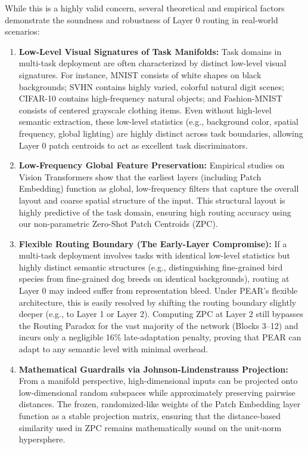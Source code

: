 \documentclass{article}
\theoremstyle{plain}
\theoremstyle{definition}
\theoremstyle{remark}
\begin{document}
While this is a highly valid concern, several theoretical and empirical factors demonstrate the soundness and robustness of Layer 0 routing in real-world scenarios:
\begin{enumerate}
    \item \textbf{Low-Level Visual Signatures of Task Manifolds:} Task domains in multi-task deployment are often characterized by distinct low-level visual signatures. For instance, MNIST consists of white shapes on black backgrounds; SVHN contains highly varied, colorful natural digit scenes; CIFAR-10 contains high-frequency natural objects; and Fashion-MNIST consists of centered grayscale clothing items. Even without high-level semantic extraction, these low-level statistics (e.g., background color, spatial frequency, global lighting) are highly distinct across task boundaries, allowing Layer 0 patch centroids to act as excellent task discriminators.
    \item \textbf{Low-Frequency Global Feature Preservation:} Empirical studies on Vision Transformers \cite{raghu2021do} show that the earliest layers (including Patch Embedding) function as global, low-frequency filters that capture the overall layout and coarse spatial structure of the input. This structural layout is highly predictive of the task domain, ensuring high routing accuracy using our non-parametric Zero-Shot Patch Centroids (ZPC).
    \item \textbf{Flexible Routing Boundary (The Early-Layer Compromise):} If a multi-task deployment involves tasks with identical low-level statistics but highly distinct semantic structures (e.g., distinguishing fine-grained bird species from fine-grained dog breeds on identical backgrounds), routing at Layer 0 may indeed suffer from representation bleed. Under PEAR's flexible architecture, this is easily resolved by shifting the routing boundary slightly deeper (e.g., to Layer 1 or Layer 2). Computing ZPC at Layer 2 still bypasses the Routing Paradox for the vast majority of the network (Blocks 3--12) and incurs only a negligible 16\% late-adaptation penalty, proving that PEAR can adapt to any semantic level with minimal overhead.
    \item \textbf{Mathematical Guardrails via Johnson-Lindenstrauss Projection:} From a manifold perspective, high-dimensional inputs can be projected onto low-dimensional random subspaces while approximately preserving pairwise distances. The frozen, randomized-like weights of the Patch Embedding layer function as a stable projection matrix, ensuring that the distance-based similarity used in ZPC remains mathematically sound on the unit-norm hypersphere.
\end{enumerate}
\end{document}
